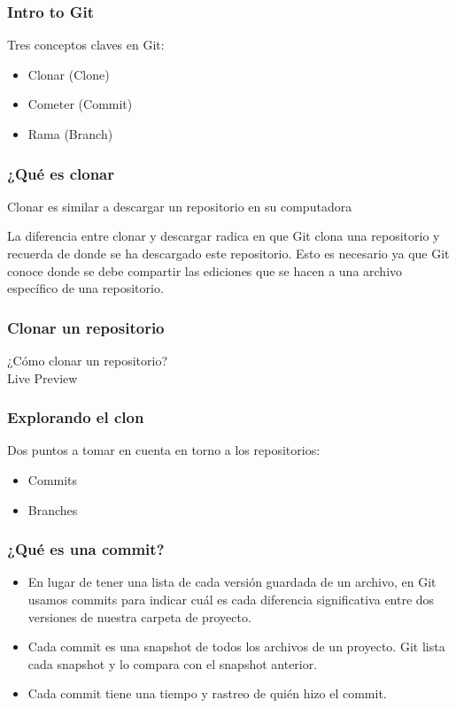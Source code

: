 \documentclass[10pt, aspectratio=169, compress]{beamer}
\begin{document}
\begin{frame}
	\frametitle{Intro to Git}

	Tres conceptos claves en Git:

	\begin{itemize}
		\item Clonar (Clone)
		\item Cometer (Commit)
		\item Rama (Branch)
	\end{itemize}
\end{frame}
\begin{frame}
	\frametitle{¿Qué es clonar}

	Clonar es similar a descargar un repositorio en su computadora

	La diferencia entre clonar y descargar radica en que Git clona una repositorio y recuerda de donde se ha descargado este repositorio. Esto es necesario ya que Git conoce donde se debe compartir las ediciones que se hacen a una archivo específico de una repositorio.
\end{frame}
\begin{frame}
	\frametitle{Clonar un repositorio}

	\begin{center}
		¿Cómo clonar un repositorio? \\ Live Preview
	\end{center}
	
\end{frame}
\begin{frame}
	\frametitle{Explorando el clon}

	Dos puntos a tomar en cuenta en torno a los repositorios: 

	\begin{itemize}
		\item Commits
		\item Branches
	\end{itemize}

\end{frame}
\begin{frame}
	\frametitle{¿Qué es una commit?}

	\begin{itemize}
		\item En lugar de tener una lista de cada versión guardada de un archivo, en Git usamos commits para indicar cuál es cada diferencia significativa entre dos versiones de nuestra carpeta de proyecto.
		\item Cada commit es una snapshot de todos los archivos de un proyecto. Git lista cada snapshot y lo compara con el snapshot anterior.
		\item Cada commit tiene una tiempo y rastreo de quién hizo el commit.  
	\end{itemize}

\end{frame}
\end{document}
